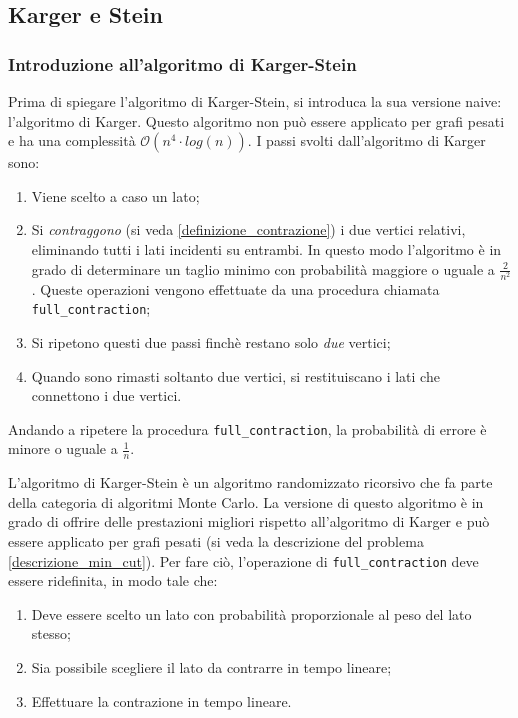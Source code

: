 \subsection{Karger e Stein}
\label{karger_stein_section}

\subsubsection{Introduzione all'algoritmo di Karger-Stein}
Prima di spiegare l'algoritmo di Karger-Stein, si introduca la sua versione naive: 
l'algoritmo di Karger. Questo algoritmo non può essere applicato per grafi pesati 
e ha una complessità $\mathcal{O}(n^4 \cdot log(n))$. I passi svolti dall'algoritmo 
di Karger sono:
\begin{enumerate}
    \item Viene scelto a caso un lato;
    \item Si \textit{contraggono} (si veda \ref{definizione_contrazione}) i due vertici 
    relativi, eliminando tutti i lati incidenti su entrambi. In questo modo l'algoritmo 
    è in grado di determinare un taglio minimo con probabilità maggiore o uguale a 
    $\frac{2}{n^2}$. Queste operazioni vengono effettuate da una procedura chiamata 
    \verb|full_contraction|;
    \item Si ripetono questi due passi finchè restano solo \textit{due} vertici;
    \item Quando sono rimasti soltanto due vertici, si restituiscano i lati che  
    connettono i due vertici.
\end{enumerate}
Andando a ripetere la procedura \verb|full_contraction|, la probabilità di errore è 
minore o uguale a $\frac{1}{n}$.

L'algoritmo di Karger-Stein è un algoritmo randomizzato ricorsivo che fa parte della 
categoria di algoritmi Monte Carlo. La versione di questo algoritmo è in grado di 
offrire delle prestazioni migliori rispetto all'algoritmo di Karger e può essere 
applicato per grafi pesati (si veda la descrizione del problema 
\ref{descrizione_min_cut}). Per fare ciò, l'operazione di \verb|full_contraction| 
deve essere ridefinita, in modo tale che:
\begin{enumerate}
    \item Deve essere scelto un lato con probabilità proporzionale al peso del lato 
    stesso;
    \item Sia possibile scegliere il lato da contrarre in tempo lineare;
    \item Effettuare la contrazione in tempo lineare.
\end{enumerate}

